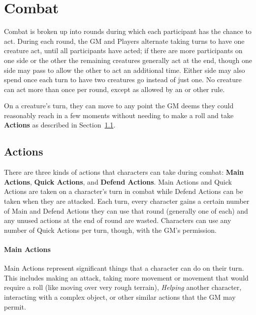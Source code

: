 \section{Combat}
Combat is broken up into rounds during which each participant has the chance to act.
During each round, the GM and Players alternate taking turns to have one creature act, until all participants have acted; if there are more participants on one side or the other the remaining creatures generally act at the end, though one side may pass to allow the other to act an additional time.
Either side may also spend \Advantage{} once each turn to have two creatures go instead of just one.
No creature can act more than once per round, except as allowed by an \Ability{} or other rule.

On a creature's turn, they can move to any point the GM deems they could reasonably reach in a few moments without needing to make a roll and take \textbf{Actions} as described in Section~\ref{sec:actions}.

\subsection{Actions}\label{sec:actions}
There are three kinds of actions that characters can take during combat: \textbf{Main Actions}, \textbf{Quick Actions}, and \textbf{Defend Actions}.
Main Actions and Quick Actions are taken on a character's turn in combat while Defend Actions can be taken when they are attacked.
Each turn, every character gains a certain number of Main and Defend Actions they can use that round (generally one of each) and any unused actions at the end of round are wasted.
Characters can use any number of Quick Actions per turn, though, with the GM's permission.

\paragraph{Main Actions}
Main Actions represent significant things that a character can do on their turn.
This includes making an attack, taking more movement or movement that would require a roll (like moving over very rough terrain), \emph{Helping} another character, interacting with a complex object, or other similar actions that the GM may permit.

